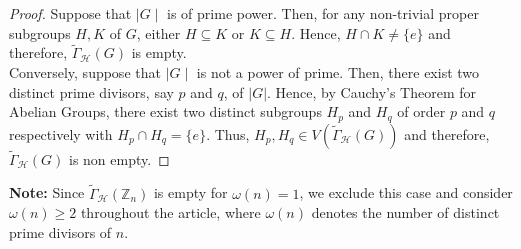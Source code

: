 \documentclass[11pt,a4paper]{article}
\theoremstyle{definition}
\theoremstyle{remark}
\begin{document}
	\begin{proof}
		Suppose that $\mid G \mid$ is  of prime power. Then, for any non-trivial proper subgroups $H,K$ of $G$, either $H \subseteq K$ or $K \subseteq H$. Hence, $H \cap K \neq \{e\}$ and therefore, $\tilde{\Gamma}_\mathcal{H}(G)$ is empty.\\
		Conversely, suppose that $\mid G \mid$ is not a power of prime. Then, there exist two distinct prime divisors, say $p$ and $q$, of $|G|$. Hence, by Cauchy’s Theorem for Abelian Groups, there exist two distinct subgroups $H_p$ and  $H_q$ of order $p$ and  $q$ respectively with $H_p \cap H_q=\{e\}$. Thus, $H_p, H_q \in V(\tilde{\Gamma}_\mathcal{H}(G))$ and therefore, $\tilde{\Gamma}_\mathcal{H}(G)$ is non empty.
	\end{proof}
\noindent \textbf{Note:}
		Since $\tilde{\Gamma}_\mathcal{H}(\mathbb{Z}_n)$ is empty for $\omega(n)=1$, we exclude this case and consider $\omega(n) \geq 2$ throughout the article, where $\omega(n)$ denotes the number of distinct prime divisors of $n$.
	
\end{document}
